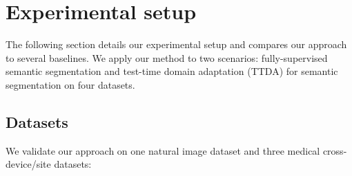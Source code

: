 \section{Experimental setup}
\label{sec:experiments}
The following section details our experimental setup and compares our approach to several baselines. We apply our method to two scenarios: fully-supervised semantic segmentation and test-time domain adaptation (TTDA) for semantic segmentation on four datasets.

\subsection{Datasets}
We validate our approach on one natural image dataset and three medical cross-device/site datasets:
